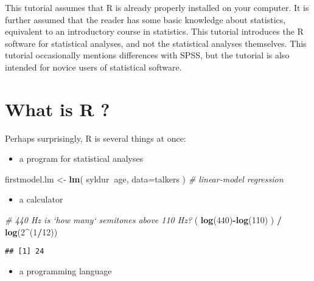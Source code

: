 \documentclass[]{book}
\newenvironment{Shaded}{\begin{snugshade}}{\end{snugshade}}
\newcommand{\CommentTok}[1]{\textcolor[rgb]{0.56,0.35,0.01}{\textit{#1}}}
\newcommand{\DataTypeTok}[1]{\textcolor[rgb]{0.13,0.29,0.53}{#1}}
\newcommand{\DecValTok}[1]{\textcolor[rgb]{0.00,0.00,0.81}{#1}}
\newcommand{\KeywordTok}[1]{\textcolor[rgb]{0.13,0.29,0.53}{\textbf{#1}}}
\newcommand{\NormalTok}[1]{#1}
\newcommand{\OperatorTok}[1]{\textcolor[rgb]{0.81,0.36,0.00}{\textbf{#1}}}
\newcommand{\StringTok}[1]{\textcolor[rgb]{0.31,0.60,0.02}{#1}}
\providecommand{\tightlist}{%
  \setlength{\itemsep}{0pt}\setlength{\parskip}{0pt}}
\begin{document}
This tutorial assumes that R is already properly
installed on your computer. It is further assumed that the reader has
some basic knowledge about statistics, equivalent to an introductory
course in statistics. This tutorial introduces the R
software for statistical analyses, and not the statistical analyses
themselves. This tutorial occasionally mentions differences with SPSS,
but the tutorial is also intended for novice users of statistical
software.

\hypertarget{sec:whatisR}{%
\section{What is R ?}\label{sec:whatisR}}

Perhaps surprisingly, R is several things at once:

\begin{itemize}
\tightlist
\item
  a program for statistical analyses
\end{itemize}

\begin{Shaded}
\begin{Highlighting}[]
\NormalTok{firstmodel.lm <-}\StringTok{ }\KeywordTok{lm}\NormalTok{( syldur}\OperatorTok{~}\NormalTok{age, }\DataTypeTok{data=}\NormalTok{talkers ) }\CommentTok{# linear-model regression}
\end{Highlighting}
\end{Shaded}

\begin{itemize}
\tightlist
\item
  a calculator
\end{itemize}

\begin{Shaded}
\begin{Highlighting}[]
\CommentTok{# 440 Hz is `how many` semitones above 110 Hz?}
\NormalTok{( }\KeywordTok{log}\NormalTok{(}\DecValTok{440}\NormalTok{)}\OperatorTok{-}\KeywordTok{log}\NormalTok{(}\DecValTok{110}\NormalTok{) ) }\OperatorTok{/}\StringTok{ }\KeywordTok{log}\NormalTok{(}\DecValTok{2}\OperatorTok{^}\NormalTok{(}\DecValTok{1}\OperatorTok{/}\DecValTok{12}\NormalTok{)) }
\end{Highlighting}
\end{Shaded}

\begin{verbatim}
## [1] 24
\end{verbatim}

\begin{itemize}
\tightlist
\item
  a programming language
\end{itemize}
\end{document}
